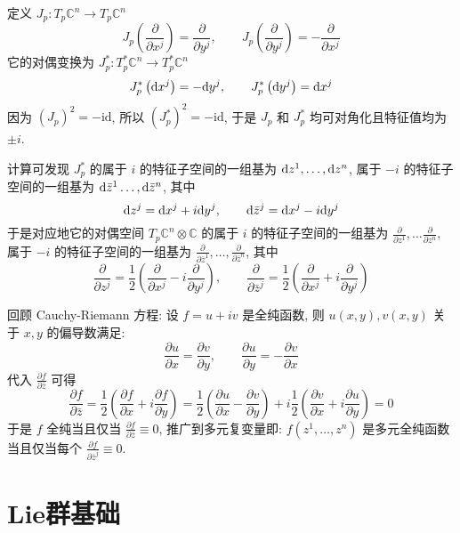 \documentclass{book}
\newcommand{\md}{{\rm d}}
\newcommand{\pd}[2]{\frac{\partial #1}{\partial #2}}
\begin{document}
        定义 $J_p:T_p\mathbb{C}^n\rightarrow T_p\mathbb{C}^n$
        \begin{equation*}
            J_p\left(\pd{}{x^j}\right)=\pd{}{y^j},\qquad J_p\left(\pd{}{y^j}\right)=-\pd{}{x^j}
        \end{equation*}
        它的对偶变换为 $J^*_p:T^*_p\mathbb{C}^n\rightarrow T^*_p\mathbb{C}^n$
        \begin{equation*}
            J^*_p\left(\md x^j\right)=-\md{y^j},\qquad J^*_p\left(\md{y^j}\right)=\md{x^j}
        \end{equation*}
        因为 $(J_p)^2=-\mathrm{id}$, 所以 $(J^*_p)^2=-\mathrm{id}$, 于是 $J_p$ 和 $J^*_p$ 均可对角化且特征值均为 $\pm i$.

        计算可发现 $J^*_p$ 的属于 $i$ 的特征子空间的一组基为 $\md{z^1},\dots,\md{z^n}$, 属于 $-i$ 的特征子空间的一组基为 $\md{\bar{z}^1}\dots,\md{\bar{z}^n}$, 其中
        \begin{equation*}
            \md{z^j}=\md{x^j}+i\md{y^j},\qquad \md{\bar{z}^j}=\md{x^j}-i\md{y^j}
        \end{equation*}
        于是对应地它的对偶空间 $T_p\mathbb{C}^n\otimes\mathbb{C}$ 的属于 $i$ 的特征子空间的一组基为 $\pd{}{z^1},\dots\pd{}{z^n}$, 属于 $-i$ 的特征子空间的一组基为 $\pd{}{\bar{z}^1},\dots,\pd{}{\bar{z}^n}$, 其中
        \begin{equation*}
            \pd{}{z^j}=\frac{1}{2}\left(\pd{}{x^j}-i\pd{}{y^j}\right),\qquad \pd{}{\bar{z}^j}=\frac{1}{2}\left(\pd{}{x^j}+i\pd{}{y^j}\right)
        \end{equation*}
        
        回顾 Cauchy-Riemann 方程: 设 $f=u+iv$ 是全纯函数, 则 $u(x,y),v(x,y)$ 关于 $x,y$ 的偏导数满足:
        \begin{equation*}
            \pd{u}{x}=\pd{v}{y},\qquad \pd{u}{y}=-\pd{v}{x}
        \end{equation*}
        代入 $\pd{f}{\bar{z}}$ 可得
        \begin{equation*}
            \pd{f}{\bar{z}}=\frac{1}{2}\left(\pd{f}{x}+i\pd{f}{y}\right)=\frac{1}{2}\left(\pd{u}{x}-\pd{v}{y}\right)+i\frac{1}{2}\left(\pd{v}{x}+i\pd{u}{y}\right)=0
        \end{equation*}
        于是 $f$ 全纯当且仅当 $\pd{f}{\bar{z}}\equiv0$, 推广到多元复变量即: $f(z^1,\dots,z^n)$ 是多元全纯函数当且仅当每个 $\pd{f}{\bar{z}^j}\equiv0$.
        
    \chapter{Lie群基础}
\end{document}
